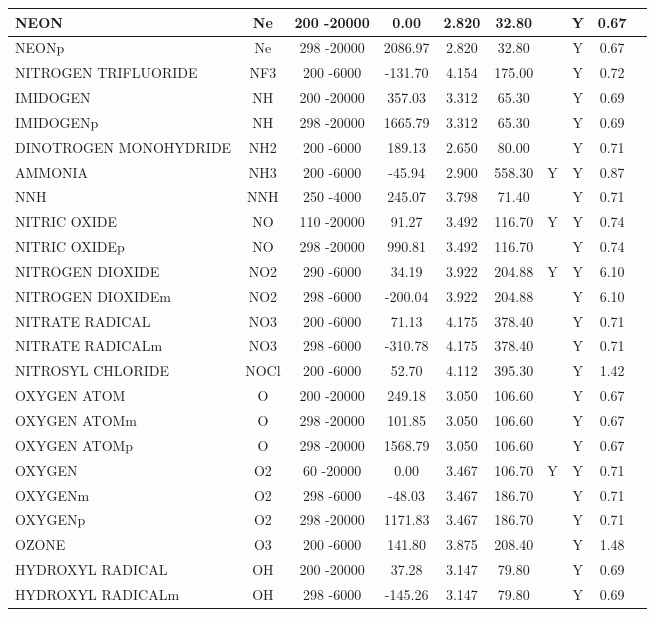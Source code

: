 \begin{longtable}{@{\extracolsep{\fill}}|l|c|c|c|c|c|c|c|c|l|}
NEON&Ne&200 -20000&    0.00& 2.820&    32.80& &Y& 0.67&\\ \hline
NEONp&Ne&298 -20000& 2086.97& 2.820&    32.80& &Y& 0.67&\\ \hline
NITROGEN TRIFLUORIDE&NF3&200 -6000& -131.70& 4.154&   175.00& &Y& 0.72&\\ \hline
IMIDOGEN&NH&200 -20000&  357.03& 3.312&    65.30& &Y& 0.69&\\ \hline
IMIDOGENp&NH&298 -20000& 1665.79& 3.312&    65.30& &Y& 0.69&\\ \hline
DINOTROGEN MONOHYDRIDE&NH2&200 -6000&  189.13& 2.650&    80.00& &Y& 0.71&\\ \hline
AMMONIA&NH3&200 -6000&  -45.94& 2.900&   558.30&Y&Y& 0.87&\\ \hline
NNH&NNH&250 -4000&  245.07& 3.798&    71.40& &Y& 0.71&\\ \hline
NITRIC OXIDE&NO&110 -20000&   91.27& 3.492&   116.70&Y&Y& 0.74&\\ \hline
NITRIC OXIDEp&NO&298 -20000&  990.81& 3.492&   116.70& &Y& 0.74&\\ \hline
NITROGEN DIOXIDE&NO2&290 -6000&   34.19& 3.922&   204.88&Y&Y& 6.10&\\ \hline
NITROGEN DIOXIDEm&NO2&298 -6000& -200.04& 3.922&   204.88& &Y& 6.10&\\ \hline
NITRATE RADICAL&NO3&200 -6000&   71.13& 4.175&   378.40& &Y& 0.71&\\ \hline
NITRATE RADICALm&NO3&298 -6000& -310.78& 4.175&   378.40& &Y& 0.71&\\ \hline
NITROSYL CHLORIDE&NOCl&200 -6000&   52.70& 4.112&   395.30& &Y& 1.42&\\ \hline
OXYGEN ATOM&O&200 -20000&  249.18& 3.050&   106.60& &Y& 0.67&\\ \hline
OXYGEN ATOMm&O&298 -20000&  101.85& 3.050&   106.60& &Y& 0.67&\\ \hline
OXYGEN ATOMp&O&298 -20000& 1568.79& 3.050&   106.60& &Y& 0.67&\\ \hline
OXYGEN&O2&60 -20000&    0.00& 3.467&   106.70&Y&Y& 0.71&\\ \hline
OXYGENm&O2&298 -6000&  -48.03& 3.467&   186.70& &Y& 0.71&\\ \hline
OXYGENp&O2&298 -20000& 1171.83& 3.467&   186.70& &Y& 0.71&\\ \hline
OZONE&O3&200 -6000&  141.80& 3.875&   208.40& &Y& 1.48&\\ \hline
HYDROXYL RADICAL&OH&200 -20000&   37.28& 3.147&    79.80& &Y& 0.69&\\ \hline
HYDROXYL RADICALm&OH&298 -6000& -145.26& 3.147&    79.80& &Y& 0.69&\\ \hline

\end{longtable}
